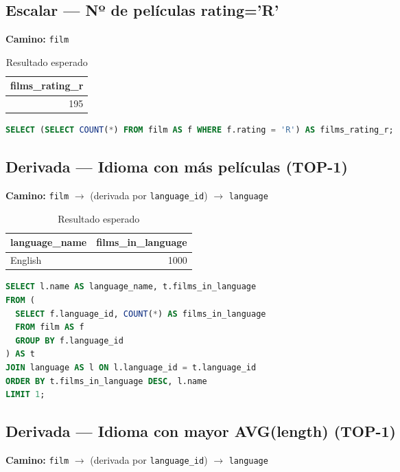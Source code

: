 \documentclass[12pt,a4paper]{article}
\begin{document}
\subsection{Escalar — Nº de películas rating='R'}
\textbf{Camino:} \texttt{film}

\begin{table}[h]
\centering
\caption{Resultado esperado}
\begin{tabular}{@{}r@{}}
\toprule
\textbf{films\_rating\_r} \\
\midrule
195 \\
\bottomrule
\end{tabular}
\end{table}

\begin{lstlisting}[language=SQL]
SELECT (SELECT COUNT(*) FROM film AS f WHERE f.rating = 'R') AS films_rating_r;
\end{lstlisting}

\subsection{Derivada — Idioma con más películas (TOP-1)}
\textbf{Camino:} \texttt{film} $\rightarrow$ (derivada por \texttt{language\_id}) $\rightarrow$ \texttt{language}

\begin{table}[h]
\centering
\caption{Resultado esperado}
\begin{tabular}{@{}l r@{}}
\toprule
\textbf{language\_name} & \textbf{films\_in\_language} \\
\midrule
English & 1000 \\
\bottomrule
\end{tabular}
\end{table}

\begin{lstlisting}[language=SQL]
SELECT l.name AS language_name, t.films_in_language
FROM (
  SELECT f.language_id, COUNT(*) AS films_in_language
  FROM film AS f
  GROUP BY f.language_id
) AS t
JOIN language AS l ON l.language_id = t.language_id
ORDER BY t.films_in_language DESC, l.name
LIMIT 1;
\end{lstlisting}

\subsection{Derivada — Idioma con mayor AVG(length) (TOP-1)}
\textbf{Camino:} \texttt{film} $\rightarrow$ (derivada por \texttt{language\_id}) $\rightarrow$ \texttt{language}
\end{document}
